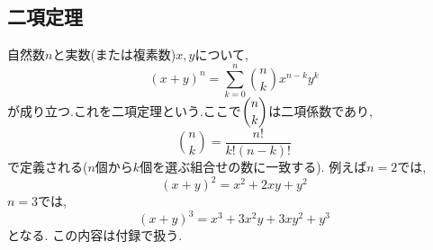 
  \subsection{二項定理}
    自然数$n$と実数(または複素数)$x,y$について,
    \[
      (x+y)^n=\sum_{k=0}^{n}\binom{n}{k}x^{n-k}y^{k}
    \]
    が成り立つ.これを二項定理という.ここで$\dbinom{n}{k}$は二項係数であり,
    \[
      \binom{n}{k}=\frac{n!}{k!(n-k)!}
    \]
    で定義される($n$個から$k$個を選ぶ組合せの数に一致する).
    例えば$n=2$では,
    \[
      (x+y)^2=x^2+2xy+y^2
    \]
    $n=3$では,
    \[
      (x+y)^3=x^3+3x^2y+3xy^2+y^3
    \]
    となる.
    この内容は付録で扱う.